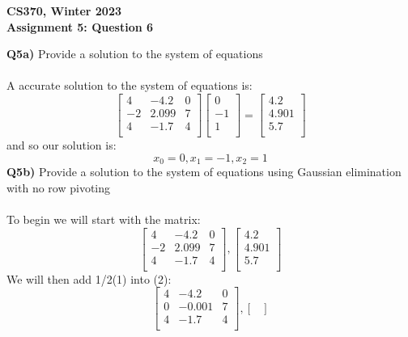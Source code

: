 \documentclass[12pt]{article}
\begin{document}
\begin{center}
{\Large\textbf{CS370, Winter 2023}}\\
\vspace{2mm}
{\Large\textbf{Assignment 5: Question 6}}\\
\vspace{3mm}
\end{center}

\begin{adjustwidth}{0em}{0pt}
\textbf{Q5a)} Provide a solution to the system of equations \\\\
A accurate solution to the system of equations is:
\[ 
\begin{bmatrix}
4 & -4.2 & 0\\
-2 & 2.099 & 7 \\
4 & -1.7 & 4 \\
\end{bmatrix}
\begin{bmatrix}
0 \\
-1 \\
1 \\
\end{bmatrix}
=
\begin{bmatrix}
4.2 \\
4.901 \\
5.7 \\
\end{bmatrix}\]
and so our solution is:
\[ x_0 = 0, x_1 = -1, x_2 = 1\]
\textbf{Q5b)} Provide a solution to the system of equations using Gaussian elimination with no row pivoting \\\\
To begin we will start with the matrix:
\[ 
\begin{bmatrix}
4 & -4.2 & 0\\
-2 & 2.099 & 7 \\
4 & -1.7 & 4 \\
\end{bmatrix}, \begin{bmatrix}
4.2 \\
4.901 \\
5.7 \\
\end{bmatrix}\]
We will then add 1/2(1) into (2):
\[ 
\begin{bmatrix}
4 & -4.2 & 0\\
0 & -0.001 & 7 \\
4 & -1.7 & 4 \\
\end{bmatrix}, \begin{bmatrix}

\end{bmatrix}\]
\end{adjustwidth}
\end{document}
